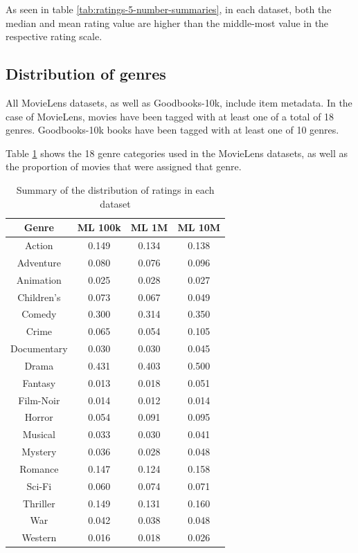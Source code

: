 As seen in table \ref{tab:ratings-5-number-summaries}, in each dataset, both the median and mean rating value are higher than the middle-most value in the respective rating scale.

\subsection{Distribution of genres}
All MovieLens datasets, as well as Goodbooks-10k, include item metadata. In the case of MovieLens, movies have been tagged with at least one of a total of 18 genres. Goodbooks-10k books have been tagged with at least one of 10 genres.

Table \ref{tab:ML-genres} shows the 18 genre categories used in the MovieLens datasets, as well as the proportion of movies that were assigned that genre.

\begin{table}[H]
\label{tab:ML-genres}
\centering
\begin{tabular}{c | c | c | c}
\toprule
\textbf{Genre} & \textbf{ML 100k} & \textbf{ML 1M} & \textbf{ML 10M} \\
\midrule
Action & 0.149 & 0.134 & 0.138 \\
Adventure & 0.080 & 0.076 & 0.096 \\
Animation & 0.025 & 0.028 & 0.027 \\
Children's & 0.073 & 0.067 & 0.049 \\
Comedy & 0.300 & 0.314 & 0.350 \\
Crime & 0.065 & 0.054 & 0.105 \\
Documentary & 0.030 & 0.030 & 0.045 \\
Drama & 0.431 & 0.403 & 0.500 \\
Fantasy & 0.013 & 0.018 & 0.051 \\
Film-Noir & 0.014 & 0.012 & 0.014 \\
Horror & 0.054 & 0.091 & 0.095 \\
Musical & 0.033 & 0.030 & 0.041 \\
Mystery & 0.036 & 0.028 & 0.048 \\
Romance & 0.147 & 0.124 & 0.158 \\
Sci-Fi & 0.060 & 0.074 & 0.071 \\
Thriller & 0.149 & 0.131 & 0.160 \\
War & 0.042 & 0.038 & 0.048 \\
Western & 0.016 & 0.018 & 0.026 \\
\bottomrule
\end{tabular}
\caption[Movies per genre as a proportion of the total]{Summary of the distribution of ratings in each dataset}
\end{table}

